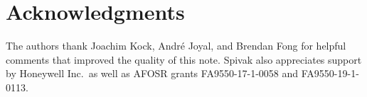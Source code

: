 \documentclass[11pt, article, one side]{memoir}
\theoremstyle{theorem}
\theoremstyle{definition}
\theoremstyle{remark}
\newcommand{\Cat}[1]{\mathsf{#1}}%
\newcommand{\ol}[1]{\overline{#1}}
\newcommand{\bun}{\Cat{Bun}}
\newcommand{\yon}{\mathcal{y}}
\newcommand{\poly}{\Cat{Poly}}
\newcommand{\dir}{\Cat{Dir}}
\newcommand{\ff}{\mathbb{F}}
\newcommand{\qqand}{\qquad\text{and}\qquad}
\begin{document}
\section*{Acknowledgments}

The authors thank Joachim Kock, Andr\'{e} Joyal, and Brendan Fong for helpful comments that improved the quality of this note. Spivak also appreciates support by Honeywell Inc.\ as well as AFOSR grants FA9550-17-1-0058 and FA9550-19-1-0113.

%
%
%
\end{document}
